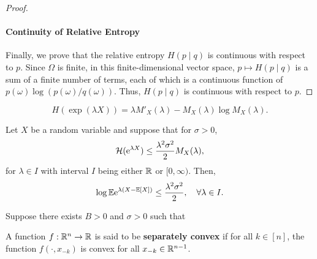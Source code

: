 \begin{proof}
	\paragraph*{Continuity of Relative Entropy}
	Finally, we prove that the relative entropy \(H(p \mid q)\) is continuous with respect to \(p\). Since \(\Omega\) is finite, in this finite-dimensional vector space, \(p \mapsto H(p \mid q)\) is a sum of a finite number of terms, each of which is a continuous function of \(p(\omega) \log(p(\omega)/q(\omega))\). Thus, \(H(p \mid q)\) is continuous with respect to \(p\).

\end{proof}

\begin{equation}
	H(\exp(\lambda X))=\lambda M'_{X}(\lambda)-M_{X}(\lambda)\log M_{X}(\lambda).
\end{equation}

\begin{proposition}
	Let \(X\) be a random variable and suppose that for \(\sigma>0\),
	\begin{equation}
		\mathcal{H}(\mathrm{e}^{\lambda X})\leq\frac{\lambda^2\sigma^2}{2}M_{X}(\lambda),
	\end{equation}
	for \(\lambda\in I\) with interval \(I\) being either \(\mathbb{R}\) or \([0, \infty)\). Then,
	\begin{equation}
		\log\mathbb{E}\mathrm{e}^{\lambda(X-\mathbb{E}[X])}\leq\frac{\lambda^2\sigma^2}{2},\quad\forall\lambda\in I.
	\end{equation}
\end{proposition}

\begin{proposition}
	Suppose there exists \(B>0\) and \(\sigma>0\) such that

\end{proposition}

\begin{definition}
	A function \(f:\mathbb{R}^{n}\to\mathbb{R}\) is said to be \textbf{separately convex} if for all \(k\in[n]\), the function \(f(\cdot, x_{-k})\) is convex for all \(x_{-k}\in\mathbb{R}^{n-1}\).
\end{definition}

\begin{definition}
\end{definition}

